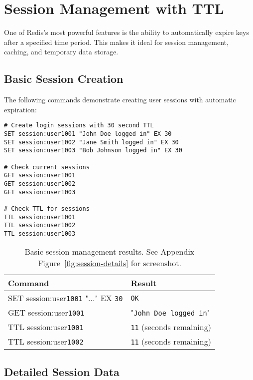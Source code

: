 \section{Session Management with TTL}

One of Redis's most powerful features is the ability to automatically expire keys after a specified time period. This makes it ideal for session management, caching, and temporary data storage.

\subsection{Basic Session Creation}

The following commands demonstrate creating user sessions with automatic expiration:

\begin{verbatim}
# Create login sessions with 30 second TTL
SET session:user1001 "John Doe logged in" EX 30
SET session:user1002 "Jane Smith logged in" EX 30
SET session:user1003 "Bob Johnson logged in" EX 30

# Check current sessions
GET session:user1001
GET session:user1002
GET session:user1003

# Check TTL for sessions
TTL session:user1001
TTL session:user1002
TTL session:user1003
\end{verbatim}

\begin{table}[H]
  \centering
  \begin{tabular}{|l|l|}
    \hline
    \textbf{Command} & \textbf{Result} \\
    \hline
    SET session:user\texttt{1001} "..." EX \texttt{30} & \texttt{OK} \\
    GET session:user\texttt{1001} & "\texttt{John Doe logged in}" \\
    TTL session:user\texttt{1001} & \texttt{11} (seconds remaining) \\
    TTL session:user\texttt{1002} & \texttt{11} (seconds remaining) \\
    \hline
  \end{tabular}
  \caption{Basic session management results. See Appendix Figure~\ref{fig:session-details} for screenshot.}
\end{table}

\subsection{Detailed Session Data}

